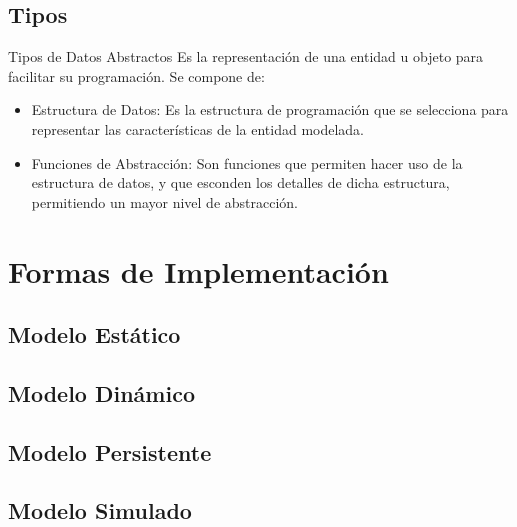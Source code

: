 \documentclass[11pt]{beamer}
\begin{document}
\subsection{Tipos}
\begin{frame}{Tipos de Datos Abstractos}
Es la representación de una entidad u objeto para facilitar su programación. Se compone de:
\begin{itemize}
\item \alert{Estructura de Datos:} Es la estructura de programación que se selecciona para representar las características de la entidad modelada.
\pause
\item \alert{Funciones de Abstracción:} Son funciones que permiten hacer uso de la estructura de datos, y que esconden los detalles de dicha estructura, permitiendo un mayor nivel de abstracción.
\end{itemize}
\end{frame}
\section{Formas de Implementación}
\begin{frame}

\end{frame}

\subsection{Modelo Estático}
\begin{frame}

\end{frame}
\subsection{Modelo Dinámico}
\subsection{Modelo Persistente}
\subsection{Modelo Simulado}
\end{document}
